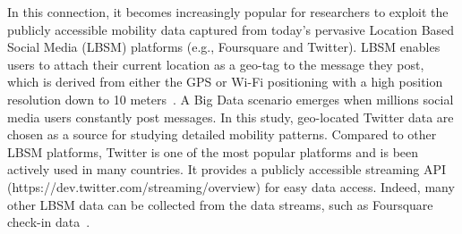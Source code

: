 \documentclass[ijgi,article,accept,moreauthors,pdftex,10pt,a4paper]{mdpi}
\theoremstyle{mdpi}
\newcounter{ex}
\newcounter{re}
\theoremstyle{mdpidefinition}
\begin{document}
In this connection, it becomes increasingly popular for researchers to exploit the publicly accessible mobility data captured from today's pervasive Location Based Social Media (LBSM) platforms (e.g., Foursquare and Twitter).
LBSM enables users to attach their current location as a geo-tag to the message they post, which is derived from either the GPS or Wi-Fi positioning with a high position resolution down to 10 meters~\cite{Jurdak2015}.
A Big Data scenario emerges when millions social media users constantly post messages.
In this study, geo-located Twitter data are chosen as a source for studying detailed mobility patterns.
Compared to other LBSM platforms, Twitter is one of the most popular platforms and is been actively used in many countries.
It provides a publicly accessible streaming API (https://dev.twitter.com/streaming/overview) for easy data access.
Indeed, many other LBSM data can be collected from the data streams, such as Foursquare check-in data~\cite{cranshaw2012livehoods,hasan2013understanding}.
\end{document}

